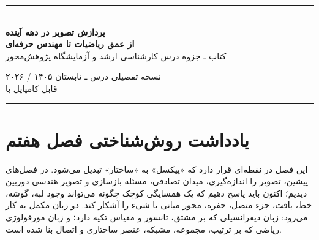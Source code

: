 \documentclass[12pt,openany,oneside]{book}
\begin{document}
\begin{titlepage}
\centering
\vspace*{0.9cm}
{\color{DeepBlue}\rule{0.9\textwidth}{1.1pt}}\\[1.0cm]
{\Huge\bfseries پردازش تصویر در دهه آینده\\[0.3cm]}
{\LARGE\bfseries از عمق ریاضیات تا مهندس حرفه‌ای\\[0.85cm]}
{\Large کتاب ـ جزوه درس کارشناسی ارشد و آزمایشگاه پژوهش‌محور\\[1.1cm]}


\vfill
{\large نسخه تفصیلی درس ـ تابستان ۱۴۰۵ / ۲۰۲۶}\\[0.4cm]
{\normalsize قابل کامپایل با }\\[0.8cm]
{\color{DeepBlue}\rule{0.9\textwidth}{1.1pt}}
\end{titlepage}

\frontmatter


\chapter*{یادداشت روش‌شناختی فصل هفتم}

این فصل در نقطه‌ای قرار دارد که «پیکسل» به «ساختار» تبدیل می‌شود. در فصل‌های پیشین، تصویر را اندازه‌گیری،
میدان تصادفی، مسئله بازسازی و تصویر هندسی دوربین دیدیم؛ اکنون باید پاسخ دهیم که یک همسایگی کوچک چگونه
می‌تواند وجود لبه، گوشه، خط، بافت، جزء متصل، حفره، محور میانی یا شیء را آشکار کند. دو زبان مکمل به کار می‌رود:
زبان دیفرانسیلی که بر مشتق، تانسور و مقیاس تکیه دارد؛ و زبان مورفولوژی ریاضی که بر ترتیب، مجموعه، مشبکه،
عنصر ساختاری و اتصال بنا شده است.
\end{document}
